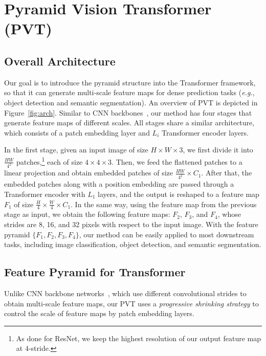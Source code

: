 \documentclass[10pt,twocolumn,letterpaper]{article}
\def\eg{\emph{e.g.}}
\begin{document}
\section{Pyramid Vision Transformer (PVT)}


\subsection{Overall Architecture}


Our goal is to introduce the pyramid structure into the Transformer framework, so that it can generate multi-scale feature maps for dense prediction tasks (\eg, object detection and semantic segmentation).
%
An overview of PVT is depicted in Figure~\ref{fig:arch}.
%
Similar to CNN backbones~\cite{he2016deep}, our method has four stages that generate feature maps of different scales.
%
All stages share a similar architecture, which consists of a patch embedding layer and $L_i$ Transformer encoder layers.

In the first stage, given an input image of size $H\!\times\!W\! \times\!3$, we first divide it into $\frac{HW}{4^2}$ patches,\footnote{As done for ResNet, we keep the highest  resolution of our output feature map at 4-stride.} each of size $4\!\times\!4\!\times\!3$.
%
Then, we feed the flattened patches to a linear projection and obtain embedded patches of size $\frac{HW}{4^2}\!\times\!C_1$.
%
After that, the embedded patches along with a position embedding  are passed through a Transformer encoder with $L_1$ layers, and the output is reshaped to a feature map $F_1$ of size $\frac{H}{4}\!\times\!\frac{W}{4}\!\times\!C_1$. 
%
In the same way, using the feature map from the previous stage as input, we obtain the following feature maps: $F_2$, $F_3$, and $F_4$, whose strides are 8, 16, and 32 pixels with respect to the input image.
%
With the feature pyramid $\{F_1, F_2, F_3, F_4\}$, our method can be easily applied to most downstream tasks, including image classification, object detection, and semantic segmentation.


\subsection{Feature Pyramid for Transformer}


%
Unlike CNN backbone networks~\cite{simonyan2014very,he2016deep}, which use different convolutional strides to obtain multi-scale feature maps, our PVT uses a \textit{progressive shrinking strategy} to control the scale of feature maps by patch embedding layers.
\end{document}
